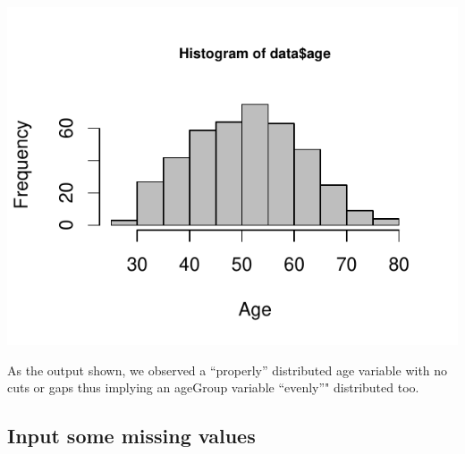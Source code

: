 \documentclass[]{article}
\newenvironment{Shaded}{\begin{snugshade}}{\end{snugshade}}
\newcommand{\KeywordTok}[1]{\textcolor[rgb]{0.13,0.29,0.53}{\textbf{#1}}}
\newcommand{\DataTypeTok}[1]{\textcolor[rgb]{0.13,0.29,0.53}{#1}}
\newcommand{\DecValTok}[1]{\textcolor[rgb]{0.00,0.00,0.81}{#1}}
\newcommand{\FloatTok}[1]{\textcolor[rgb]{0.00,0.00,0.81}{#1}}
\newcommand{\StringTok}[1]{\textcolor[rgb]{0.31,0.60,0.02}{#1}}
\newcommand{\OtherTok}[1]{\textcolor[rgb]{0.56,0.35,0.01}{#1}}
\newcommand{\OperatorTok}[1]{\textcolor[rgb]{0.81,0.36,0.00}{\textbf{#1}}}
\newcommand{\NormalTok}[1]{#1}
\begin{document}
\begin{Shaded}
\end{Shaded}

\includegraphics{survival_pbc_files/figure-latex/unnamed-chunk-5-1.pdf}

As the output shown, we observed a ``properly'' distributed age variable
with no cuts or gaps thus implying an ageGroup variable ``evenly''"
distributed too.

\begin{Shaded}
\end{Shaded}

\subsection{Input some missing values}\label{input-some-missing-values}
\end{document}
